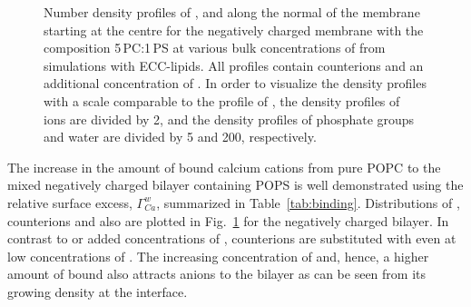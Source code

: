 \documentclass[journal=jpcbfk,manuscript=article]{achemso}
\begin{document}
\begin{figure}[htbp!]
  \caption{\label{fig:cacl-dens_PCPS} 
    Number density profiles of ,  and  along the normal of the membrane starting at the centre
    for the negatively charged membrane with the composition 5\,PC:1\,PS
    at various bulk concentrations of  from simulations with ECC-lipids. 
    All profiles contain  counterions and an additional concentration of . 
    In order to visualize the density profiles with a scale comparable to the profile of ,  
    the density profiles of~ ions are divided by 2, and 
    the density profiles of phosphate groups and water are divided by 5 and 200, respectively.  
  }
\end{figure} 
 





The increase in the amount of bound calcium cations from pure POPC \cite{melcr18}
to the mixed negatively charged bilayer containing POPS
is well demonstrated using the relative surface excess, $\Gamma ^w _{Ca}$,
summarized in Table~\ref{tab:binding}. 
Distributions of ,  counterions and also  
are plotted in Fig.~\ref{fig:cacl-dens_PCPS} for the negatively charged bilayer. 
In contrast to  or added concentrations of , 
 counterions are substituted with  even at low concentrations of . 
The increasing concentration of  and, hence, a higher amount of bound 
also attracts  anions to the bilayer 
as can be seen from its growing density at the interface. 
\end{document}
